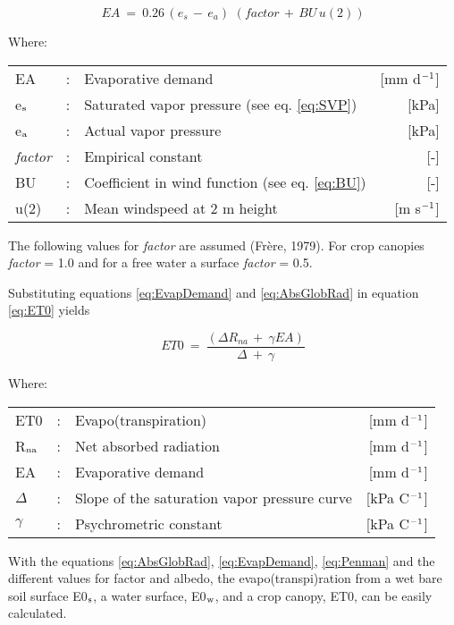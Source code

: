 \begin{equation}
\label{eq:EvapDemand}
EA~=~0.26\, (e _{s} \, -\, e _{a} )\,\, (factor\, +\, BU\, u(2))
\end{equation}

Where:\\[5pt]
\begin{tabularx}{\textwidth}{llXr}
	EA &:& Evaporative demand  & [mm d$^{{\rm -1}}$]\\
	e$_{{\rm s}}$ &:& Saturated vapor pressure (see eq. \ref{eq:SVP})  & [kPa]\\
	e$_{{\rm a}}$ &:& Actual vapor pressure  & [kPa]\\
	{\it factor} &:& Empirical constant  & [-]\\
	BU &:& Coefficient in wind function (see eq. \ref{eq:BU})  & [-]\\
	u(2) &:& Mean windspeed at 2 m height  & [m s$^{{\rm -1}}$]\\
\end{tabularx}

The following values for {\it factor} are assumed (Fr\`{e}re, 1979). For crop canopies {\it factor} =
1.0 and for a free water a surface {\it factor} = 0.5.

Substituting equations \ref{eq:EvapDemand} and \ref{eq:AbsGlobRad} in equation \ref{eq:ET0} yields

\begin{equation}
\label{eq:Penman}
ET0 ~=~{\frac{(\Delta R _{na~} +~\gamma EA)}{\Delta ~+~\gamma }}
\end{equation}

Where:\\[5pt]
\begin{tabularx}{\textwidth}{llXr}
	ET0 &:& Evapo(transpiration)  & [mm d$^{{\rm -1}}$]\\
	R$_{{\rm na}}$ &:& Net absorbed radiation  & [mm d$^{{\rm -1}}$]\\
	EA &:& Evaporative demand  & [mm d$^{{\rm -1}}$]\\
	$\Delta$ &:& Slope of the saturation vapor pressure curve   & [kPa \degrees C$^{{\rm -1}}$]\\
	$\gamma$ &:& Psychrometric constant  & [kPa \degrees C$^{{\rm -1}}$]
\end{tabularx}

With the equations \ref{eq:AbsGlobRad}, \ref{eq:EvapDemand}, \ref{eq:Penman} and the different values for factor and albedo, the evapo(transpi)ration from a wet bare soil surface E0$_{{\rm s}}$, a water surface, E0$_{{\rm w}}$, and a crop canopy, ET0, can be easily calculated.

